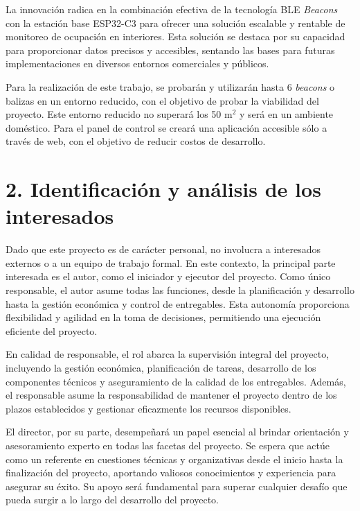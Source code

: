\documentclass[
11pt, %
]{charter}
\begin{document}
\vspace{25px}

La innovación radica en la combinación efectiva de la tecnología BLE \textit{Beacons} con la estación base ESP32-C3 para ofrecer una solución escalable y rentable de monitoreo de ocupación en interiores. Esta solución se destaca por su capacidad para proporcionar datos precisos y accesibles, sentando las bases para futuras implementaciones en diversos entornos comerciales y públicos. 

Para la realización de este trabajo, se probarán y utilizarán hasta 6 \textit{beacons} o balizas en un entorno reducido, con el objetivo de probar la viabilidad del proyecto. Este entorno reducido no superará los 50 m$^2$ y será en un ambiente doméstico. Para el panel de control se creará una aplicación accesible sólo a través de web, con el objetivo de reducir costos de desarrollo.

\section{2. Identificación y análisis de los interesados}
\label{sec:interesados}

Dado que este proyecto es de carácter personal, no involucra a interesados externos o a un equipo de trabajo formal. En este contexto, la principal parte interesada es el autor, como el iniciador y ejecutor del proyecto. Como único responsable, el autor asume todas las funciones, desde la planificación y desarrollo hasta la gestión económica y control de entregables. Esta autonomía proporciona flexibilidad y agilidad en la toma de decisiones, permitiendo una ejecución eficiente del proyecto.

En calidad de responsable, el rol abarca la supervisión integral del proyecto, incluyendo la gestión económica, planificación de tareas, desarrollo de los componentes técnicos y aseguramiento de la calidad de los entregables. Además, el responsable asume la responsabilidad de mantener el proyecto dentro de los plazos establecidos y gestionar eficazmente los recursos disponibles.

El director, por su parte, desempeñará un papel esencial al brindar orientación y asesoramiento experto en todas las facetas del proyecto. Se espera que actúe como un referente en cuestiones técnicas y organizativas desde el inicio hasta la finalización del proyecto, aportando valiosos conocimientos y experiencia para asegurar su éxito. Su apoyo será fundamental para superar cualquier desafío que pueda surgir a lo largo del desarrollo del proyecto.
\end{document}
